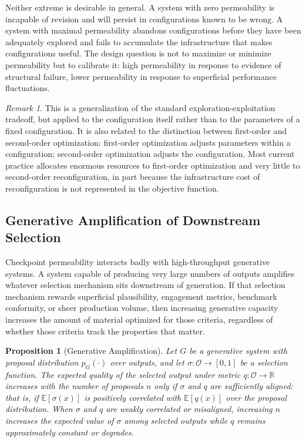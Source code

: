 \documentclass[11pt,a4paper]{article}
\theoremstyle{plain}
\newtheorem{proposition}[theorem]{Proposition}
\theoremstyle{definition}
\theoremstyle{remark}
\newtheorem{remark}[theorem]{Remark}
\begin{document}
Neither extreme is desirable in general. A system with zero permeability is incapable of revision and will persist in configurations known to be wrong. A system with maximal permeability abandons configurations before they have been adequately explored and fails to accumulate the infrastructure that makes configurations useful. The design question is not to maximize or minimize permeability but to calibrate it: high permeability in response to evidence of structural failure, lower permeability in response to superficial performance fluctuations.

\begin{remark}
This is a generalization of the standard exploration-exploitation tradeoff, but applied to the configuration itself rather than to the parameters of a fixed configuration. It is also related to the distinction between first-order and second-order optimization: first-order optimization adjusts parameters within a configuration; second-order optimization adjusts the configuration. Most current practice allocates enormous resources to first-order optimization and very little to second-order reconfiguration, in part because the infrastructure cost of reconfiguration is not represented in the objective function.
\end{remark}

\subsection{Generative Amplification of Downstream Selection}

Checkpoint permeability interacts badly with high-throughput generative systems. A system capable of producing very large numbers of outputs amplifies whatever selection mechanism sits downstream of generation. If that selection mechanism rewards superficial plausibility, engagement metrics, benchmark conformity, or sheer production volume, then increasing generative capacity increases the amount of material optimized for those criteria, regardless of whether those criteria track the properties that matter.

\begin{proposition}[Generative Amplification]
\label{prop:amplification}
Let $G$ be a generative system with proposal distribution $p_G(\cdot)$ over outputs, and let $\sigma: \mathcal{O} \to [0,1]$ be a selection function. The expected quality of the selected output under metric $q: \mathcal{O} \to \mathbb{R}$ increases with the number of proposals $n$ only if $\sigma$ and $q$ are sufficiently aligned: that is, if $\mathbb{E}[\sigma(x)]$ is positively correlated with $\mathbb{E}[q(x)]$ over the proposal distribution. When $\sigma$ and $q$ are weakly correlated or misaligned, increasing $n$ increases the expected value of $\sigma$ among selected outputs while $q$ remains approximately constant or degrades.
\end{proposition}
\end{document}
